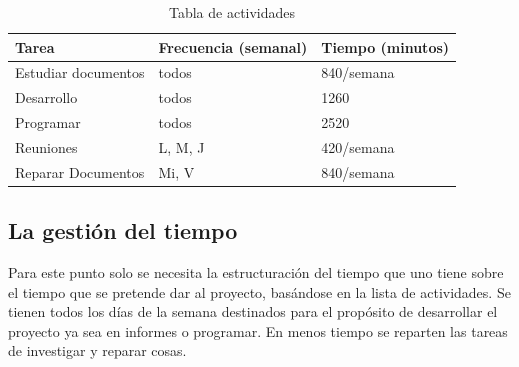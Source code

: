 \documentclass[a4paper,12pt,openany,oneside]{book}
\begin{document}
\newpage
\begin{table}
\begin{tabular}{|l | l | l |}
\hline
\textbf{Tarea} & \textbf{Frecuencia (semanal)} & \textbf{Tiempo (minutos)} \\
\hline
Estudiar documentos & todos & 840/semana\\
\hline
Desarrollo & todos & 1260\\
\hline
Programar & todos & 2520\\
\hline
Reuniones & L, M, J & 420/semana\\
\hline
Reparar Documentos & Mi, V & 840/semana\\
\hline
\end{tabular}
\caption{Tabla de actividades}
\end{table}
\subsection{La gestión del tiempo}
Para este punto solo se necesita la estructuración del tiempo que uno tiene sobre el tiempo que se pretende dar al proyecto, basándose en la lista de actividades. Se tienen todos los días de la semana destinados para el propósito de desarrollar el proyecto ya sea en informes o programar. En menos tiempo se reparten las tareas de investigar y reparar cosas.
\end{document}

